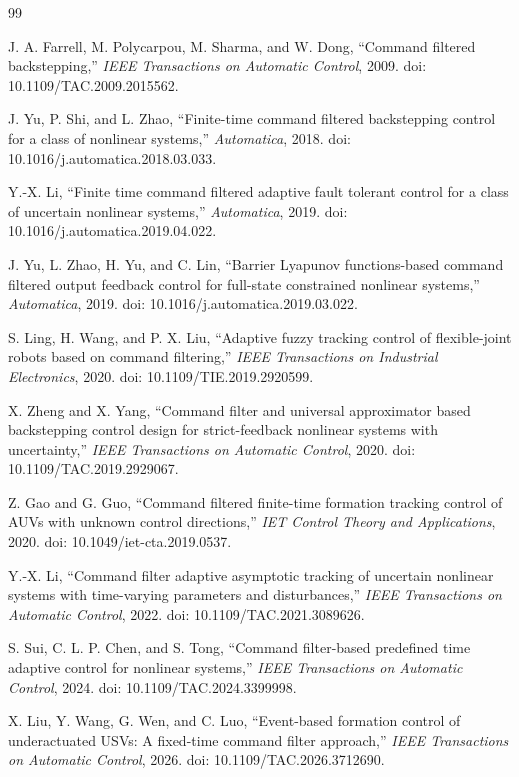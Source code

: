 \documentclass[UTF8,a4paper,11pt,fontset=fandol]{ctexart}
\begin{document}
\begin{thebibliography}{99}

J. A. Farrell, M. Polycarpou, M. Sharma, and W. Dong,
``Command filtered backstepping,''
\emph{IEEE Transactions on Automatic Control}, 2009.
doi: 10.1109/TAC.2009.2015562.

J. Yu, P. Shi, and L. Zhao,
``Finite-time command filtered backstepping control for a class of nonlinear systems,''
\emph{Automatica}, 2018.
doi: 10.1016/j.automatica.2018.03.033.

Y.-X. Li,
``Finite time command filtered adaptive fault tolerant control for a class of uncertain nonlinear systems,''
\emph{Automatica}, 2019.
doi: 10.1016/j.automatica.2019.04.022.

J. Yu, L. Zhao, H. Yu, and C. Lin,
``Barrier Lyapunov functions-based command filtered output feedback control for full-state constrained nonlinear systems,''
\emph{Automatica}, 2019.
doi: 10.1016/j.automatica.2019.03.022.

S. Ling, H. Wang, and P. X. Liu,
``Adaptive fuzzy tracking control of flexible-joint robots based on command filtering,''
\emph{IEEE Transactions on Industrial Electronics}, 2020.
doi: 10.1109/TIE.2019.2920599.

X. Zheng and X. Yang,
``Command filter and universal approximator based backstepping control design for strict-feedback nonlinear systems with uncertainty,''
\emph{IEEE Transactions on Automatic Control}, 2020.
doi: 10.1109/TAC.2019.2929067.

Z. Gao and G. Guo,
``Command filtered finite-time formation tracking control of AUVs with unknown control directions,''
\emph{IET Control Theory and Applications}, 2020.
doi: 10.1049/iet-cta.2019.0537.

Y.-X. Li,
``Command filter adaptive asymptotic tracking of uncertain nonlinear systems with time-varying parameters and disturbances,''
\emph{IEEE Transactions on Automatic Control}, 2022.
doi: 10.1109/TAC.2021.3089626.

S. Sui, C. L. P. Chen, and S. Tong,
``Command filter-based predefined time adaptive control for nonlinear systems,''
\emph{IEEE Transactions on Automatic Control}, 2024.
doi: 10.1109/TAC.2024.3399998.

X. Liu, Y. Wang, G. Wen, and C. Luo,
``Event-based formation control of underactuated USVs: A fixed-time command filter approach,''
\emph{IEEE Transactions on Automatic Control}, 2026.
doi: 10.1109/TAC.2026.3712690.

\end{thebibliography}
\end{document}
